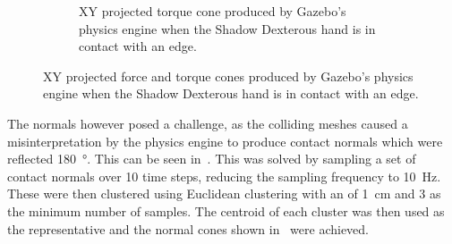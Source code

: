\begin{figure}[!h]
\begin{subfigure}[b]{0.48\textwidth}
		\caption{XY projected torque cone produced by Gazebo's physics engine when the Shadow Dexterous hand is in contact with an edge.}
		\label{fig:xy-projected-torque-cones}
	\end{subfigure}
		\caption{XY projected force and torque cones produced by Gazebo's physics engine when the Shadow Dexterous hand is in contact with an edge.}
		\label{fig:xy-projected-force-torque-cones}
\end{figure}

The normals however posed a challenge, as the colliding meshes caused a misinterpretation by the physics engine to produce contact normals which were reflected \SI{180}{\degree}. This can be seen in~. This was solved by sampling a set of contact normals over \num{10} time steps, reducing the sampling frequency to \SI{10}{\hertz}. These were then clustered using Euclidean clustering with an \mvar{\epsilon} of \SI{1}{\centi\meter} and \num{3} as the minimum number of samples. The centroid of each cluster was then used as the representative and the normal cones shown in~ were achieved.


